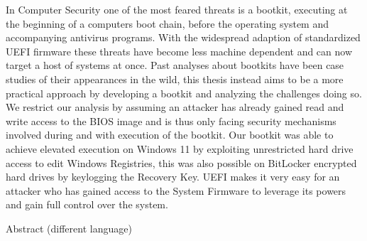 

\label{sec:abstract}

In Computer Security one of the most feared threats is a bootkit, executing at the beginning of a computers boot chain, before the operating system and accompanying antivirus programs. With the widespread adaption of standardized UEFI firmware these threats have become less machine dependent and can now target a host of systems at once.
Past analyses about bootkits have been case studies of their appearances in the wild, this thesis instead aims to be a more practical approach by developing a bootkit and analyzing the challenges doing so.
We restrict our analysis by assuming an attacker has already gained read and write access to the BIOS image and is thus only facing security mechanisms involved during and with execution of the bootkit.
Our bootkit was able to achieve elevated execution on Windows 11 by exploiting unrestricted hard drive access to edit Windows Registries, this was also possible on BitLocker encrypted hard drives by keylogging the Recovery Key.
UEFI makes it very easy for an attacker who has gained access to the System Firmware to leverage its powers and gain full control over the system.

\vspace*{20mm}

{Abstract (different language)}
\label{sec:abstract-diff}

\blindtext
